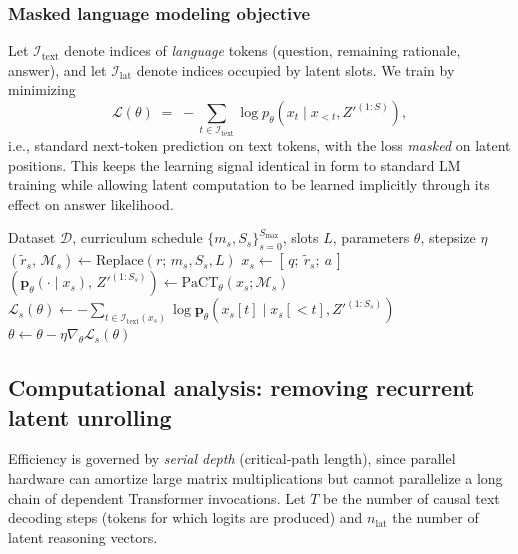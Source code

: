 \subsubsection{Masked language modeling objective}
\label{sec:loss}

Let $\mathcal{I}_{\text{text}}$ denote indices of \emph{language} tokens (question, remaining rationale,
answer), and let $\mathcal{I}_{\text{lat}}$ denote indices occupied by latent slots. We train by minimizing
\[
\mathcal{L}(\theta) \;=\;
-\sum_{t\in \mathcal{I}_{\text{text}}}
\log p_\theta(x_{t}\mid x_{<t}, Z'^{(1:S)}),
\]
i.e., standard next-token prediction on text tokens, with the loss \emph{masked} on latent positions.
This keeps the learning signal identical in form to standard LM training while allowing latent
computation to be learned implicitly through its effect on answer likelihood. 


\begin{algorithm}[t]
\caption{Curriculum training for PaCT}
\label{alg:cct_formal}
\begin{algorithmic}[1]
\Require Dataset $\mathcal{D}$, curriculum schedule $\{m_s,S_s\}_{s=0}^{S_{\max}}$, slots $L$, parameters $\theta$, stepsize $\eta$
    \State $(\tilde{r}_s,\,\mathcal{M}_s)\leftarrow \mathrm{Replace}(r;\,m_s, S_s, L)$
    \State $x_s \leftarrow [\,q;\ \tilde{r}_s;\ a\,]$
    \State $(\mathbf{p}_\theta(\cdot\mid x_s),\,Z'^{(1:S_s)}) \leftarrow \mathrm{PaCT}_\theta(x_s;\mathcal{M}_s)$
    \State $\mathcal{L}_s(\theta)\leftarrow -\sum\limits_{t\in \mathcal{I}_{\text{text}}(x_s)} \log \mathbf{p}_\theta(x_s[t]\mid x_s[<t],Z'^{(1:S_s)})$
    \State $\theta \leftarrow \theta - \eta \nabla_\theta \mathcal{L}_s(\theta)$
  \EndFor
\EndFor
\end{algorithmic}
\end{algorithm}


\subsection{Computational analysis: removing recurrent latent unrolling}
\label{sec:complexity}

Efficiency is governed by \emph{serial depth} (critical-path length), since parallel hardware can amortize
large matrix multiplications but cannot parallelize a long chain of dependent Transformer invocations.
Let $T$ be the number of causal text decoding steps (tokens for which logits are produced) and
$n_{\text{lat}}$ the number of latent reasoning vectors.


